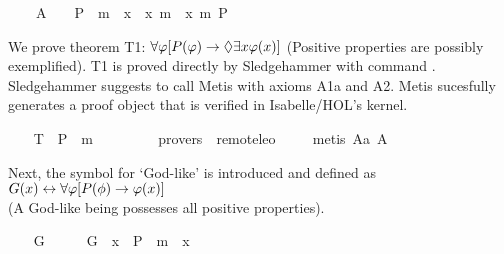 \begin{isabellebody}
\ \ \ \ A{}{\isacharcolon}\ \ {\isachardoublequoteopen}{\isacharbrackleft}{\isasymforall}{\isacharparenleft}{\isasymlambda}{\isasymphi}{\isachardot}\ {\isasymforall}{\isacharparenleft}{\isasymlambda}{\isasympsi}{\isachardot}\ {\isacharparenleft}P\ {\isasymphi}\ m{\isasymand}\ {\isasymbox}\ {\isacharparenleft}{\isasymforall}{\isacharparenleft}{\isasymlambda}x{\isachardot}\ {\isasymphi}\ x\ m{\isasymrightarrow}\ {\isasympsi}\ x{\isacharparenright}{\isacharparenright}{\isacharparenright}\ m{\isasymrightarrow}\ P\ {\isasympsi}{\isacharparenright}{\isacharparenright}{\isacharbrackright}{\isachardoublequoteclose}%
\begin{isamarkuptext}%
We prove theorem T1: $\forall \varphi [P(\varphi) \rightarrow \Diamond \exists x \varphi(x)]$ (Positive 
properties are possibly exemplified). T1 is proved directly by Sledgehammer with command . 
Sledgehammer suggests to call Metis with axioms A1a and A2. 
Metis sucesfully generates a proof object 
that is verified in Isabelle/HOL's kernel.%
\end{isamarkuptext}%
\isamarkuptrue%
\ \ \isamarkupfalse%
\ T{}{\isacharcolon}\ {\isachardoublequoteopen}{\isacharbrackleft}{\isasymforall}{\isacharparenleft}{\isasymlambda}{\isasymphi}{\isachardot}\ P\ {\isasymphi}\ m{\isasymrightarrow}\ {\isasymdiamond}\ {\isacharparenleft}{\isasymexists}\ {\isasymphi}{\isacharparenright}{\isacharparenright}{\isacharbrackright}{\isachardoublequoteclose}\ \ \isanewline
\ \ \isamarkupfalse%
\ {\isacharbrackleft}provers\ {\isacharequal}\ remote{\isacharunderscore}leo{}{\isacharbrackright}\ \isanewline
%
\isadelimproof
\ \ %
\endisadelimproof
%
\isatagproof
{}\isamarkupfalse%
\ {\isacharparenleft}metis\ A{}a\ A{}{\isacharparenright}%
\endisatagproof
{\isafoldproof}%
%
\isadelimproof
%
\endisadelimproof
%
\begin{isamarkuptext}%
Next, the symbol  for `God-like'  is introduced and defined 
as $G(x) \leftrightarrow \forall \varphi [P(\phi) \to \varphi(x)]$ \\ (A God-like being possesses 
all positive properties).%
\end{isamarkuptext}%
\isamarkuptrue%
\ \ \isamarkupfalse%
\ G\ {\isacharcolon}{\isacharcolon}\ {\isachardoublequoteopen}{\isasymmu}\ {\isasymRightarrow}\ {\isasymsigma}{\isachardoublequoteclose}\ \ {\isachardoublequoteopen}G\ {\isacharequal}\ {\isacharparenleft}{\isasymlambda}x{\isachardot}\ {\isasymforall}{\isacharparenleft}{\isasymlambda}{\isasymphi}{\isachardot}\ P\ {\isasymphi}\ m{\isasymrightarrow}\ {\isasymphi}\ x{\isacharparenright}{\isacharparenright}{\isachardoublequoteclose}%

\end{isabellebody}
